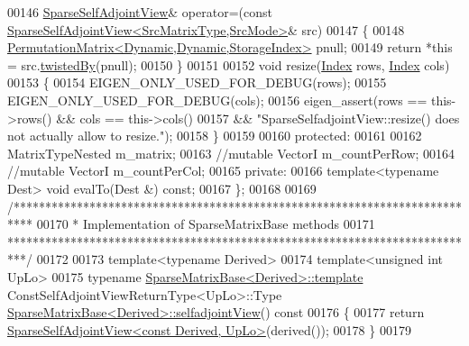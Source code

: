 \begin{DoxyCode}
00146     \hyperlink{group___sparse_core___module_class_eigen_1_1_sparse_self_adjoint_view}{SparseSelfAdjointView}& operator=(\textcolor{keyword}{const} 
      \hyperlink{group___sparse_core___module_class_eigen_1_1_sparse_self_adjoint_view}{SparseSelfAdjointView<SrcMatrixType,SrcMode>}& src)
00147     \{
00148       \hyperlink{group___core___module}{PermutationMatrix<Dynamic,Dynamic,StorageIndex>} pnull;
00149       \textcolor{keywordflow}{return} *\textcolor{keyword}{this} = src.\hyperlink{group___sparse_core___module_acde15b45cf7b43520e1005ec65d55f3c}{twistedBy}(pnull);
00150     \}
00151     
00152     \textcolor{keywordtype}{void} resize(\hyperlink{group___core___module_a554f30542cc2316add4b1ea0a492ff02}{Index} rows, \hyperlink{group___core___module_a554f30542cc2316add4b1ea0a492ff02}{Index} cols)
00153     \{
00154       EIGEN\_ONLY\_USED\_FOR\_DEBUG(rows);
00155       EIGEN\_ONLY\_USED\_FOR\_DEBUG(cols);
00156       eigen\_assert(rows == this->rows() && cols == this->cols()
00157                 && \textcolor{stringliteral}{"SparseSelfadjointView::resize() does not actually allow to resize."});
00158     \}
00159     
00160   \textcolor{keyword}{protected}:
00161 
00162     MatrixTypeNested m\_matrix;
00163     \textcolor{comment}{//mutable VectorI m\_countPerRow;}
00164     \textcolor{comment}{//mutable VectorI m\_countPerCol;}
00165   \textcolor{keyword}{private}:
00166     \textcolor{keyword}{template}<\textcolor{keyword}{typename} Dest> \textcolor{keywordtype}{void} evalTo(Dest &) \textcolor{keyword}{const};
00167 \};
00168 
00169 \textcolor{comment}{/***************************************************************************}
00170 \textcolor{comment}{* Implementation of SparseMatrixBase methods}
00171 \textcolor{comment}{***************************************************************************/}
00172 
00173 \textcolor{keyword}{template}<\textcolor{keyword}{typename} Derived>
00174 \textcolor{keyword}{template}<\textcolor{keywordtype}{unsigned} \textcolor{keywordtype}{int} UpLo>
00175 \textcolor{keyword}{typename} \hyperlink{group___sparse_core___module_class_eigen_1_1_sparse_matrix_base}{SparseMatrixBase<Derived>::template} 
      ConstSelfAdjointViewReturnType<UpLo>::Type \hyperlink{group___sparse_core___module_class_eigen_1_1_sparse_matrix_base}{SparseMatrixBase<Derived>::selfadjointView}()\textcolor{keyword}{ const}
00176 \textcolor{keyword}{}\{
00177   \textcolor{keywordflow}{return} \hyperlink{group___sparse_core___module_class_eigen_1_1_sparse_self_adjoint_view}{SparseSelfAdjointView<const Derived, UpLo>}(derived());
00178 \}
00179 

\end{DoxyCode}
